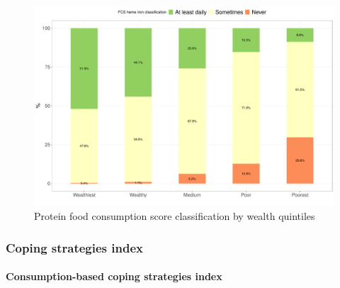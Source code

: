 \documentclass[12pt,a4paper]{article}
\let\oldparagraph\paragraph
\renewcommand{\paragraph}[1]{\oldparagraph{#1}\mbox{}}
\begin{document}
\begin{figure}[H]

{\centering \includegraphics{kayahReport_files/figure-latex/fcsn6plot-1} 

}

\caption{Protein food consumption score classification by wealth quintiles}\label{fig:fcsn6plot}
\end{figure}

\hypertarget{csi-results}{%
\subsubsection{Coping strategies index}\label{csi-results}}

\hypertarget{ccsi-results}{%
\paragraph{Consumption-based coping strategies index}\label{ccsi-results}}
\end{document}
